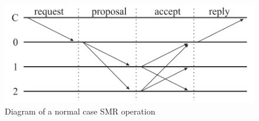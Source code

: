 

\begin{figure}[t]
    \centering
    \includegraphics[width=.65\linewidth]{img/paxos}
    \caption{Diagram of a normal case SMR operation}\label{fig:paxos}
\end{figure}

